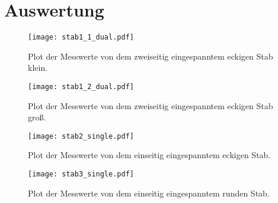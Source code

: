 \section{Auswertung}
\label{sec:Auswertung}

\begin{figure}
  \centering
  \texttt{[image: stab1\_1\_dual.pdf]}
  \caption{Plot der Messwerte von dem zweiseitig eingespanntem eckigen Stab klein.}
  \label{fig:stab1_1-plot}
\end{figure}

\begin{figure}
  \centering
  \texttt{[image: stab1\_2\_dual.pdf]}
  \caption{Plot der Messwerte von dem zweiseitig eingespanntem eckigen Stab groß.}
  \label{fig:stab1_2-plot}
\end{figure}

\begin{figure}
  \centering
  \texttt{[image: stab2\_single.pdf]}
  \caption{Plot der Messwerte von dem einseitig eingespanntem eckigen Stab.}
  \label{fig:stab1-plot}
\end{figure}

\begin{figure}
  \centering
  \texttt{[image: stab3\_single.pdf]}
  \caption{Plot der Messwerte von dem einseitig eingespanntem runden Stab.}
  \label{fig:stab1-plot}
\end{figure}
